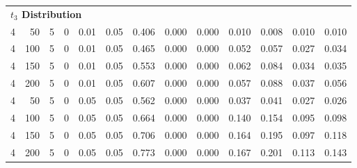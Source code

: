 \begin{table}
{{\begin{tabular}{rrrrrrlllllll}
\multicolumn{13}{l}{\textbf{$t_3$ Distribution}}\\
\hspace{1em}4 & 50 & 5 & 0 & 0.01 & 0.05 & 0.406 & 0.000 & 0.000 & 0.010 & 0.008 & 0.010 & 0.010\\
\hspace{1em}4 & 100 & 5 & 0 & 0.01 & 0.05 & 0.465 & 0.000 & 0.000 & 0.052 & 0.057 & 0.027 & 0.034\\
\hspace{1em}4 & 150 & 5 & 0 & 0.01 & 0.05 & 0.553 & 0.000 & 0.000 & 0.062 & 0.084 & 0.034 & 0.035\\
\hspace{1em}4 & 200 & 5 & 0 & 0.01 & 0.05 & 0.607 & 0.000 & 0.000 & 0.057 & 0.088 & 0.037 & 0.056\\
\hspace{1em}4 & 50 & 5 & 0 & 0.05 & 0.05 & 0.562 & 0.000 & 0.000 & 0.037 & 0.041 & 0.027 & 0.026\\
\hspace{1em}4 & 100 & 5 & 0 & 0.05 & 0.05 & 0.664 & 0.000 & 0.000 & 0.140 & 0.154 & 0.095 & 0.098\\
\hspace{1em}4 & 150 & 5 & 0 & 0.05 & 0.05 & 0.706 & 0.000 & 0.000 & 0.164 & 0.195 & 0.097 & 0.118\\
\hspace{1em}4 & 200 & 5 & 0 & 0.05 & 0.05 & 0.773 & 0.000 & 0.000 & 0.167 & 0.201 & 0.113 & 0.143\\
\bottomrule
\end{tabular}
}}
 \end{table}
